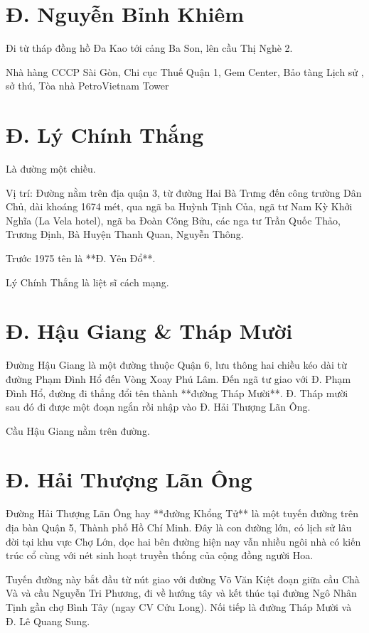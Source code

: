 \section{Đ. Nguyễn Bỉnh Khiêm}

Đi từ tháp đồng hồ Đa Kao tới cảng Ba Son, lên cầu Thị Nghè 2.

Nhà hàng CCCP Sài Gòn, Chi cục Thuế Quận 1, Gem Center, Bảo tàng Lịch sử , sở thú, Tòa nhà PetroVietnam Tower


\section{Đ. Lý Chính Thắng}

Là đường một chiều.

Vị trí: Đường nằm trên địa quận 3, từ đường Hai Bà Trưng đến công trường Dân Chủ, dài khoáng 1674 mét, qua ngã ba Huỳnh Tịnh Của, ngã tư Nam Kỳ Khởi Nghĩa (La Vela hotel), ngã ba Đoàn Công Bửu, các nga tư Trần Quốc Thảo, Trương Định, Bà Huyện Thanh Quan, Nguyễn Thông.

Trước 1975 tên là **Đ. Yên Đổ**.

Lý Chính Thắng là liệt sĩ cách mạng.

\section{Đ. Hậu Giang & Tháp Mười}

Đường Hậu Giang là một đường thuộc Quận 6, lưu thông hai chiều kéo dài từ đường Phạm Đình Hổ đến Vòng Xoay Phú Lâm. Đến ngã tư giao với Đ. Phạm Đình Hổ, đường đi thẳng đổi tên thành **đường Tháp Mười**. Đ. Tháp mười sau đó đi được một đoạn ngắn rồi nhập vào Đ. Hải Thượng Lãn Ông.

Cầu Hậu Giang nằm trên đường.

\section{Đ. Hải Thượng Lãn Ông}

Đường Hải Thượng Lãn Ông hay **đường Khổng Tử** là một tuyến đường trên địa bàn Quận 5, Thành phố Hồ Chí Minh. Đây là con đường lớn, có lịch sử lâu đời tại khu vực Chợ Lớn, dọc hai bên đường hiện nay vẫn nhiều ngôi nhà có kiến trúc cổ cùng với nét sinh hoạt truyền thống của cộng đồng người Hoa.

Tuyến đường này bắt đầu từ nút giao với đường Võ Văn Kiệt đoạn giữa cầu Chà Và và cầu Nguyễn Tri Phương, đi về hướng tây và kết thúc tại đường Ngô Nhân Tịnh gần chợ Bình Tây (ngay CV Cửu Long). Nối tiếp là đường Tháp Mười và Đ. Lê Quang Sung.

